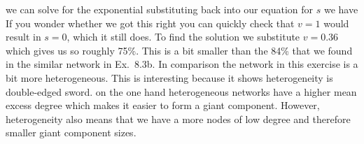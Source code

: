 we can solve for the exponential 
substituting back into our equation for $s$ we have
If you wonder whether we got this right you can quickly check that $v=1$ would result in $s=0$, which it still does. To find the solution we substitute $v=0.36$ which gives us 
so roughly 75\%. This is a bit smaller than the 84\% that we found 
in the similar network in Ex.~8.3b. In comparison the network in this exercise is a bit more heterogeneous. This is interesting because it shows heterogeneity is double-edged sword. on the one hand heterogeneous networks have a higher mean excess degree which makes it easier to form a giant component. However, heterogeneity also means that we have a more nodes of low degree and therefore smaller giant component sizes.   

